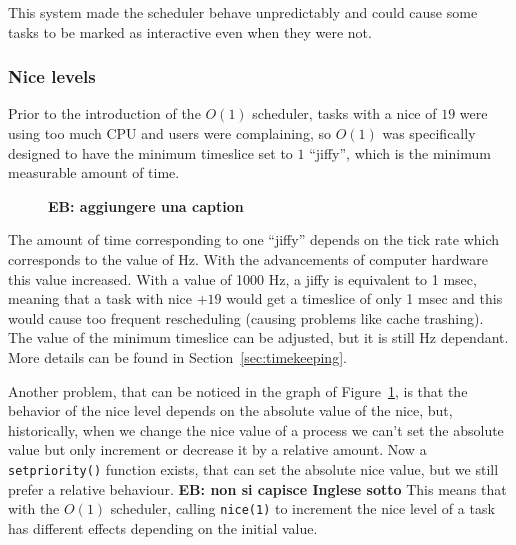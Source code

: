\documentclass[10pt, oneside]{book}
\newcommand{\mycomment}[1]{\textbf{#1}}  %
\begin{document}
This system made the scheduler behave unpredictably and could cause some tasks to be marked as interactive even when they were not.

\subsubsection{Nice levels}%
Prior to the introduction of the $O(1)$ scheduler, tasks with a nice
of $19$ were using too much CPU and users were complaining, so $O(1)$
was specifically designed to have the minimum timeslice set to $1$
``jiffy'', which is the minimum measurable amount of time.  
\begin{figure}[t]
  \centering
  \caption{\mycomment{EB: aggiungere una caption}}
  \label{fig:timeslice_vs_nice}
\end{figure}

The amount of time corresponding to one ``jiffy'' depends on the tick
rate which corresponds to the value of Hz. With the advancements of
computer hardware this value increased. With a value of 1000 Hz, a
jiffy is equivalent to 1 msec, meaning that a task with nice $+19$
would get a timeslice of only 1 msec and this would cause too frequent
rescheduling (causing problems like cache trashing). The value of the
minimum timeslice can be adjusted, but it is still Hz dependant.  More
details can be found in Section~\ref{sec:timekeeping}.

Another problem, that can be noticed in the graph of
Figure~\ref{fig:timeslice_vs_nice}, is that the behavior of the nice
level depends on the absolute value of the nice, but, historically,
when we change the nice value of a process we can't set the absolute
value but only increment or decrease it by a relative amount. Now a
\verb|setpriority()| function exists, that can set the absolute nice
value, but we still prefer a relative behaviour.  \mycomment{EB: non
  si capisce Inglese sotto} This means that with the $O(1)$ scheduler,
calling \verb|nice(1)| to increment the nice level of a task has
different effects depending on the initial value.
\end{document}
